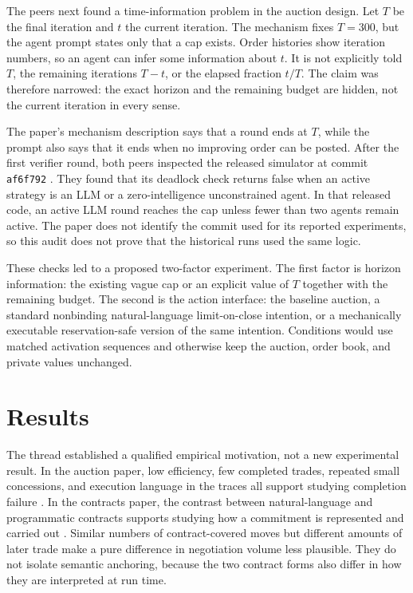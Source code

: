 \documentclass{article}
\begin{document}
The peers next found a time-information problem in the auction design.  Let $T$ be the final iteration and $t$ the current iteration.  The mechanism fixes $T=300$, but the agent prompt states only that a cap exists.  Order histories show iteration numbers, so an agent can infer some information about $t$.  It is not explicitly told $T$, the remaining iterations $T-t$, or the elapsed fraction $t/T$.  The claim was therefore narrowed: the exact horizon and the remaining budget are hidden, not the current iteration in every sense.

The paper's mechanism description says that a round ends at $T$, while the prompt also says that it ends when no improving order can be posted.  After the first verifier round, both peers inspected the released simulator at commit \texttt{af6f792} \cite{Qcode}.  They found that its deadlock check returns false when an active strategy is an LLM or a zero-intelligence unconstrained agent.  In that released code, an active LLM round reaches the cap unless fewer than two agents remain active.  The paper does not identify the commit used for its reported experiments, so this audit does not prove that the historical runs used the same logic.

These checks led to a proposed two-factor experiment.  The first factor is horizon information: the existing vague cap or an explicit value of $T$ together with the remaining budget.  The second is the action interface: the baseline auction, a standard nonbinding natural-language limit-on-close intention, or a mechanically executable reservation-safe version of the same intention.  Conditions would use matched activation sequences and otherwise keep the auction, order book, and private values unchanged.

\section{Results}

The thread established a qualified empirical motivation, not a new experimental result.  In the auction paper, low efficiency, few completed trades, repeated small concessions, and execution language in the traces all support studying completion failure \cite{Q}.  In the contracts paper, the contrast between natural-language and programmatic contracts supports studying how a commitment is represented and carried out \cite{P}.  Similar numbers of contract-covered moves but different amounts of later trade make a pure difference in negotiation volume less plausible.  They do not isolate semantic anchoring, because the two contract forms also differ in how they are interpreted at run time.
\end{document}
